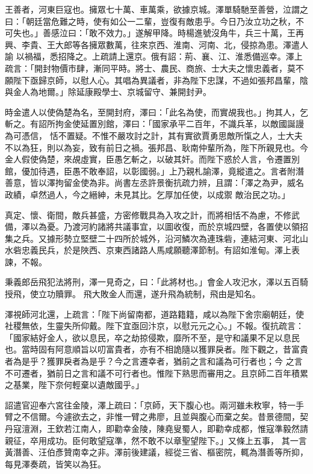 \begin{pinyinscope}
 王善者，河東巨寇也。擁眾七十萬、車萬乘，欲據京城。澤單騎馳至善營，泣謂之曰：「朝廷當危難之時，使有如公一二輩，豈復有敵患乎。今日乃汝立功之秋，不可失也。」善感泣曰：「敢不效力。」遂解甲降。時楊進號沒角牛，兵三十萬，王再興、李貴、王大郎等各擁眾數萬，往來京西、淮南、河南、北，侵掠為患。澤遣人諭
 以禍福，悉招降之。上疏請上還京。俄有詔：荊、襄、江、淮悉備巡幸。澤上疏言：「開封物價市肆，漸同平時。將士、農民、商旅、士大夫之懷忠義者，莫不願陛下亟歸京師，以慰人心。其唱為異議者，非為陛下忠謀，不過如張邦昌輩，陰與金人為地爾。」除延康殿學士、京城留守、兼開封尹。



 時金遣人以使偽楚為名，至開封府，澤曰：「此名為使，而實覘我也。」拘其人，乞斬之。有詔所拘金使延置別館，澤曰：「國家承平二百年，不識兵革，以敵國誕謾為可憑信，
 恬不置疑。不惟不嚴攻討之計，其有實欲賈勇思敵所愾之人，士大夫不以為狂，則以為妄，致有前日之禍。張邦昌、耿南仲輩所為，陛下所親見也。今金人假使偽楚，來覘虛實，臣愚乞斬之，以破其奸。而陛下惑於人言，令遷置別館，優加待遇，臣愚不敢奉詔，以彰國弱。」上乃親札諭澤，竟縱遣之。言者附潛善意，皆以澤拘留金使為非。尚書左丞許景衡抗疏力辨，且謂：「澤之為尹，威名政績，卓然過人，今之縉紳，未見其比。乞厚加任使，以成禦
 敵治民之功。」



 真定、懷、衛間，敵兵甚盛，方密修戰具為入攻之計，而將相恬不為慮，不修武備，澤以為憂。乃渡河約諸將共議事宜，以圖收復，而於京城四壁，各置使以領招集之兵。又據形勢立堅壁二十四所於城外，沿河鱗次為連珠砦，連結河東、河北山水砦忠義民兵，於是陜西、京東西諸路人馬咸願聽澤節制。有詔如淮甸。澤上表諫，不報。



 秉義郎岳飛犯法將刑，澤一見奇之，曰：「此將材也。」會金人攻汜水，澤以五百騎授飛，使立功贖罪。
 飛大敗金人而還，遂升飛為統制，飛由是知名。



 澤視師河北還，上疏言：「陛下尚留南都，道路籍籍，咸以為陛下舍宗廟朝廷，使社稷無依，生靈失所仰戴。陛下宜亟回汴京，以慰元元之心。」不報。復抗疏言：「國家結好金人，欲以息民，卒之劫掠侵欺，靡所不至，是守和議果不足以息民也。當時固有阿意順旨以叨富貴者，亦有不相詭隨以獲罪戾者。陛下觀之，昔富貴者為是乎？獲罪戾者為是乎？今之言遷幸者，猶前之言和議為可行者也；今
 之言不可遷者，猶前日之言和議不可行者也。惟陛下熟思而審用之。且京師二百年積累之基業，陛下奈何輕棄以遺敵國乎。」



 詔遣官迎奉六宮往金陵，澤上疏曰：「京師，天下腹心也。兩河雖未敉寧，特一手臂之不信爾。今遽欲去之，非惟一臂之弗廖，且並與腹心而棄之矣。昔景德間，契丹寇澶淵，王欽若江南人，即勸幸金陵，陳堯叟蜀人，即勸幸成都，惟寇準毅然請親征，卒用成功。臣何敢望寇準，然不敢不以章聖望陛下。」又條上五事，
 其一言黃潛善、汪伯彥贊南幸之非。澤前後建議，經從三省、樞密院，輒為潛善等所抑，每見澤奏疏，皆笑以為狂。




\end{pinyinscope}
